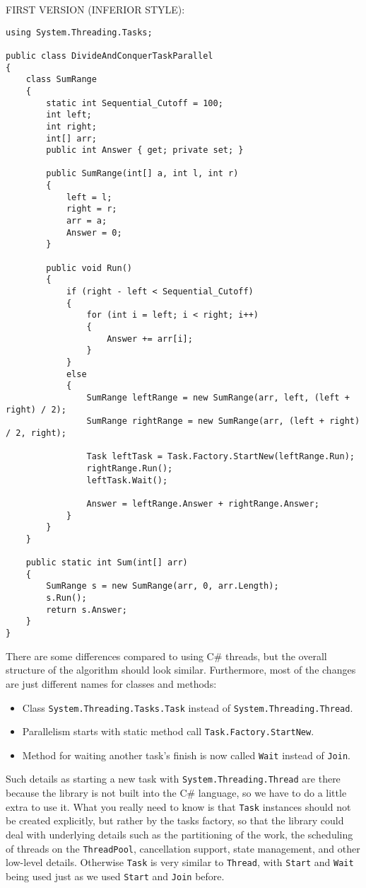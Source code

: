 \documentclass[10pt]{article}
\begin{document}
\medskip
\noindent FIRST VERSION (INFERIOR STYLE):

\begin{verbatim}
using System.Threading.Tasks;

public class DivideAndConquerTaskParallel
{
    class SumRange
    {
        static int Sequential_Cutoff = 100;
        int left;
        int right;
        int[] arr;
        public int Answer { get; private set; }

        public SumRange(int[] a, int l, int r)
        {
            left = l;
            right = r;
            arr = a;
            Answer = 0;
        }

        public void Run()
        {
            if (right - left < Sequential_Cutoff)
            {
                for (int i = left; i < right; i++)
                {
                    Answer += arr[i];
                }
            }
            else
            {
                SumRange leftRange = new SumRange(arr, left, (left + right) / 2);
                SumRange rightRange = new SumRange(arr, (left + right) / 2, right);

                Task leftTask = Task.Factory.StartNew(leftRange.Run);
                rightRange.Run();
                leftTask.Wait();

                Answer = leftRange.Answer + rightRange.Answer;
            }
        }
    }

    public static int Sum(int[] arr)
    {
        SumRange s = new SumRange(arr, 0, arr.Length);
        s.Run();
        return s.Answer;
    }
}
\end{verbatim}

There are some differences compared to using C\# threads, but 
the overall structure of the algorithm should look similar. 
Furthermore, most of the changes are just different names for classes and methods:
\begin{itemize}
\item Class {\tt System.Threading.Tasks.Task} instead of {\tt System.Threading.Thread}.
\item Parallelism starts with static method call {\tt Task.Factory.StartNew}.
\item Method for waiting another task's finish is now called {\tt Wait} instead of {\tt Join}.
\end{itemize}

Such details as starting a new task with {\tt System.Threading.Thread} 
are there because the library is not built into the C\# language, so 
we have to do a little extra to use it. What you really need to know is 
that {\tt Task} instances should not be created explicitly, but rather 
by the tasks factory, so that the library could deal with underlying 
details such as the partitioning of the work, the scheduling of threads 
on the {\tt ThreadPool}, cancellation support, state management, and 
other low-level details. Otherwise {\tt Task} is very similar to {\tt Thread}, 
with {\tt Start} and {\tt Wait} being used just as we used {\tt Start} 
and {\tt Join} before.
\end{document}
